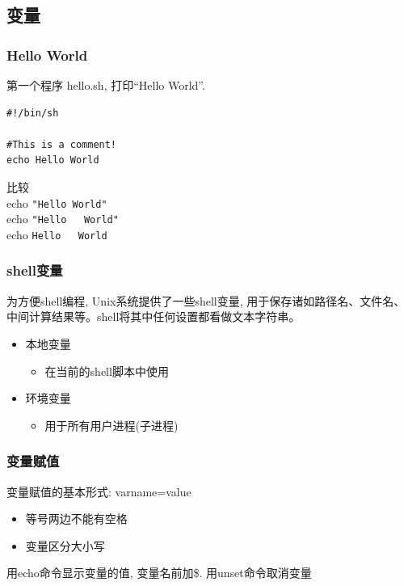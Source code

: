 \documentclass[compress]{beamer}
\begin{document}
\subsection{变量}

\begin{frame}[fragile]

\frametitle{Hello World}

第一个程序 hello.sh, 打印``Hello World''. \\
\begin{lstlisting}
#!/bin/sh

#This is a comment!
echo Hello World 
\end{lstlisting}

比较 \\
echo \verb*="Hello World"= \\
echo \verb*="Hello   World"= \\
echo \verb*=Hello   World= 


\end{frame}

\begin{frame}
\frametitle{shell变量}

为方便shell编程, Unix系统提供了一些shell变量,
用于保存诸如路径名、文件名、中间计算结果等。shell将其中任何设置都看做文本字符串。
\begin{itemize}
\item 本地变量
\begin{itemize}
\item 在当前的shell脚本中使用
\end{itemize}
\item 环境变量
\begin{itemize}
\item 用于所有用户进程(子进程)
\end{itemize}
\end{itemize}

\end{frame}

\begin{frame}
\frametitle{变量赋值}

\begin{block}{变量赋值的基本形式: varname=value}
\begin{itemize}
\item 等号两边不能有空格
\item 变量区分大小写
\end{itemize}
\end{block}
用echo命令显示变量的值, 变量名前加\$. 用unset命令取消变量


\end{frame}
\end{document}
